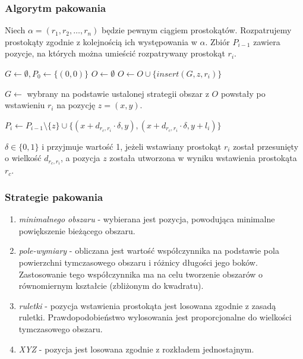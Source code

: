 \documentclass{beamer}
\begin{document}
\begin{frame}
    \frametitle{Algorytm pakowania}   
    Niech $\alpha=(r_1,r_2,\dots,r_n)$ będzie pewnym ciągiem prostokątów. Rozpatrujemy prostokąty
    zgodnie z kolejnością ich występowania w $\alpha$. Zbiór $P_{i-1}$ zawiera pozycje, na
    których można umieścić rozpatrywany prostokąt $r_i$.
    
    \begin{algorithmic}
        \State $G\gets\emptyset, P_0\gets\{(0,0)\}$
            \State $O\gets\emptyset$
             $O\gets O \cup \{insert(G, z, r_i)\}$\EndFor
            \State \parbox[t]{\dimexpr\linewidth-\algorithmicindent}{ $G\gets$ wybrany na
            podstawie ustalonej strategii obszar z $O$ powstały po wstawieniu $r_i$
            na pozycję $z=(x,y)$.}
            \State $P_i\gets P_{i-1}\setminus\{z\}\cup\{(x+d_{r_c,r_i}\cdot\delta,y),
            (x+d_{r_c,r_i}\cdot\delta,y+l_i)\}$
        \EndFor
    \end{algorithmic}
    $\delta\in\{0,1\}$ i przyjmuje wartość 1, jeżeli wstawiany prostokąt $r_i$ został
    przesunięty o wielkość $d_{r_c,r_i}$, a pozycja $z$ została utworzona w wyniku
    wstawienia prostokąta $r_c$.
    
\end{frame}


\begin{frame}
    \frametitle{Strategie pakowania}
    \begin{enumerate}
        \item \textit{minimalnego obszaru} - wybierana jest pozycja, powodująca minimalne
        powiększenie bieżącego obszaru.
        \item \textit{pole-wymiary} - obliczana jest wartość współczynnika na podstawie pola
        powierzchni tymczasowego obszaru i różnicy długości jego boków. Zastosowanie
        tego współczynnika ma na celu tworzenie obszarów o równomiernym kształcie (zbliżonym
        do kwadratu).
        \item \textit{ruletki} - pozycja wstawienia prostokąta jest losowana zgodnie z zasadą
        ruletki. Prawdopodobieństwo wylosowania jest proporcjonalne do wielkości tymczasowego
        obszaru.
        \item \textit{XYZ} - pozycja jest losowana zgodnie z rozkładem jednostajnym.
    \end{enumerate}
\end{frame}
\end{document}
